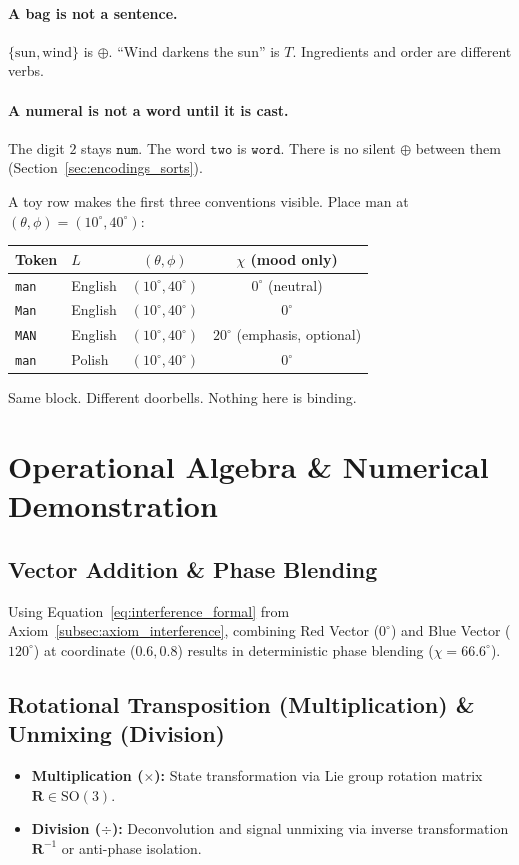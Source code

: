 \documentclass[12pt, a4paper]{article}
\begin{document}
\paragraph{A bag is not a sentence.}
$\{\mathrm{sun},\mathrm{wind}\}$ is $\oplus$.
``Wind darkens the sun'' is $T$. Ingredients and order are different
verbs.

\paragraph{A numeral is not a word until it is cast.}
The digit $2$ stays $\mathtt{num}$. The word $\texttt{two}$ is
$\mathtt{word}$. There is no silent $\oplus$ between them
(Section~\ref{sec:encodings_sorts}).

A toy row makes the first three conventions visible. Place
$\mathrm{man}$ at $(\theta,\phi)=(10^\circ,40^\circ)$:

\begin{center}
\begin{tabular}{llcc}
Token & $L$ & $(\theta,\phi)$ & $\chi$ (mood only) \\
\hline
\texttt{man} & English & $(10^\circ,40^\circ)$ & $0^\circ$ (neutral) \\
\texttt{Man} & English & $(10^\circ,40^\circ)$ & $0^\circ$ \\
\texttt{MAN} & English & $(10^\circ,40^\circ)$ & $20^\circ$ (emphasis, optional) \\
\texttt{man} & Polish  & $(10^\circ,40^\circ)$ & $0^\circ$ \\
\end{tabular}
\end{center}

Same block. Different doorbells. Nothing here is binding.

\section{Operational Algebra \& Numerical Demonstration}

\subsection{Vector Addition \& Phase Blending}
Using Equation~\eqref{eq:interference_formal} from Axiom~\ref{subsec:axiom_interference}, combining Red Vector ($0^\circ$) and Blue Vector ($120^\circ$) at coordinate ($0.6, 0.8$) results in deterministic phase blending ($\chi = 66.6^\circ$).

\subsection{Rotational Transposition (Multiplication) \& Unmixing (Division)}
\begin{itemize}
    \item \textbf{Multiplication ($\times$):} State transformation via Lie group rotation matrix $\mathbf{R} \in \mathrm{SO}(3)$.
    \item \textbf{Division ($\div$):} Deconvolution and signal unmixing via inverse transformation $\mathbf{R}^{-1}$ or anti-phase isolation.
\end{itemize}
\end{document}
